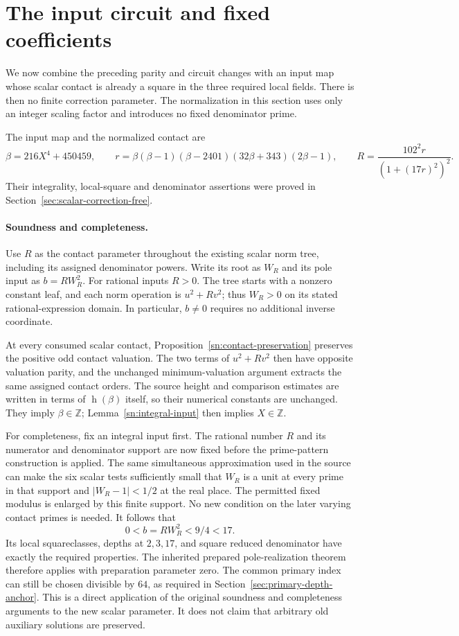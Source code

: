 \documentclass[11pt,a4paper]{article}
\theoremstyle{definition}
\theoremstyle{remark}
\begin{document}
\section{The input circuit and fixed coefficients}
\label{sec:quartic-465}

We now combine the preceding parity and circuit changes with an input map
whose scalar contact is already a square in the three required local fields.
There is then no finite correction parameter. The normalization in this
section uses only an integer scaling factor and introduces no fixed
denominator prime.

The input map and the normalized contact are
\[
 \beta=216X^4+450459,\qquad
 r=\beta(\beta-1)(\beta-2401)(32\beta+343)(2\beta-1),
 \qquad R=\frac{102^2r}{(1+(17r)^2)^2}.
\]
Their integrality, local-square and denominator assertions were
proved in Section~\ref{sec:scalar-correction-free}.

\paragraph{Soundness and completeness.}
Use $R$ as the contact parameter throughout the existing scalar
norm tree, including its assigned denominator powers. Write its
root as $W_R$ and its pole input as $b=RW_R^2$. For rational
inputs $R>0$. The tree starts with a nonzero constant leaf, and
each norm operation is $u^2+Rv^2$; thus $W_R>0$ on its stated
rational-expression domain. In particular, $b\ne0$ requires no
additional inverse coordinate.

At every consumed scalar contact, Proposition~\ref{sn:contact-preservation}
preserves the positive odd contact valuation. The two terms of
$u^2+Rv^2$ then have opposite valuation parity, and the unchanged
minimum-valuation argument extracts the same assigned contact
orders. The source height and comparison estimates are written
in terms of $\operatorname h(\beta)$ itself, so their numerical
constants are unchanged. They imply $\beta\in\mathbb Z$;
Lemma~\ref{sn:integral-input} then implies $X\in\mathbb Z$.

For completeness, fix an integral input first. The rational number
$R$ and its numerator and denominator support are now fixed before
the prime-pattern construction is applied. The same simultaneous
approximation used in the source can make the six scalar tests
sufficiently small that $W_R$ is a unit at every prime in that
support and $|W_R-1|<1/2$ at the real place. The permitted fixed
modulus is enlarged by this finite support. No new condition on
the later varying contact primes is needed. It follows that
\[
                 0<b=RW_R^2<9/4<17.
\]
Its local squareclasses, depths at $2,3,17$, and square reduced
denominator have exactly the required properties. The inherited
prepared pole-realization theorem therefore applies with preparation
parameter zero. The common primary index can still be chosen
divisible by $64$, as required in Section~\ref{sec:primary-depth-anchor}.
This is a direct application of the original soundness and
completeness arguments to the new scalar parameter. It does not
claim that arbitrary old auxiliary solutions are preserved.
\end{document}
